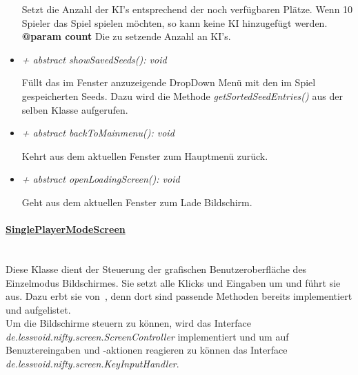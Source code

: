 \begin{itemize}
                    \begin{leftbar}[0.9\linewidth]
                        Setzt die Anzahl der KI's entsprechend der noch verfügbaren 
                        Plätze. Wenn 10 Spieler das Spiel spielen möchten, so kann 
                        keine KI hinzugefügt werden.\\
                        \textbf{@param count} Die zu setzende Anzahl an KI's.\\
                    \end{leftbar}
                \item  \textit{+ {abstract} showSavedSeeds(): void} 
                    \begin{leftbar}[0.9\linewidth]
                        Füllt das im Fenster anzuzeigende DropDown Menü mit den im Spiel
                        gespeicherten Seeds. Dazu wird die Methode \textit{getSortedSeedEntries()} aus
                        der selben Klasse aufgerufen. \\
                    \end{leftbar}
                \item  \textit{+ {abstract} backToMainmenu(): void} 
                    \begin{leftbar}[0.9\linewidth]
                        Kehrt aus dem aktuellen Fenster zum Hauptmenü zurück.\\
                    \end{leftbar}
                \item  \textit{+ {abstract} openLoadingScreen(): void} 
                    \begin{leftbar}[0.9\linewidth]
                        Geht aus dem aktuellen Fenster zum Lade Bildschirm.\\
                    \end{leftbar}
            \end{itemize}
        
        \pagebreak
		\paragraph{\underline{SinglePlayerModeScreen}} \mbox{}\\
            Diese Klasse dient der Steuerung der grafischen Benutzeroberfläche
            des Einzelmodus Bildschirmes. Sie setzt alle Klicks und Eingaben
            um und führt sie aus. Dazu erbt sie von~, denn dort
            sind passende Methoden bereits implementiert und aufgelistet.\\
            Um die Bildschirme steuern zu können, wird das Interface
            \textit{de.lessvoid.nifty.screen.ScreenController} implementiert und um auf
            Benuztereingaben und -aktionen reagieren zu können das Interface
            \textit{de.lessvoid.nifty.screen.KeyInputHandler}.  \par

